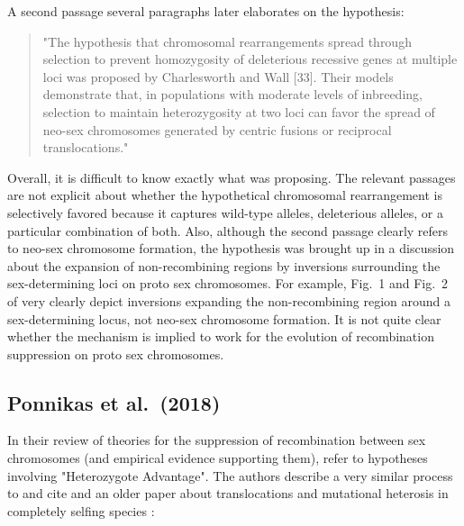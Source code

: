 \documentclass{article}
\begin{document}
\begin{appendices}
\noindent A second passage several paragraphs later elaborates on the hypothesis:

	\begin{quote}
		"The hypothesis that chromosomal rearrangements spread through selection to prevent homozygosity of deleterious recessive genes at multiple loci was proposed by Charlesworth and Wall [33]. Their models demonstrate that, in populations with moderate levels of inbreeding, selection to maintain heterozygosity at two loci can favor the spread of neo-sex chromosomes generated by centric fusions or reciprocal translocations."
	\end{quote}

\noindent Overall, it is difficult to know exactly what \citet{Ironside2010} was proposing. The relevant passages are not explicit about whether the hypothetical chromosomal rearrangement is selectively favored because it captures wild-type alleles, deleterious alleles, or a particular combination of both. Also, although the second passage clearly refers to neo-sex chromosome formation, the hypothesis was brought up in a discussion about the expansion of non-recombining regions by inversions surrounding the sex-determining loci on proto sex chromosomes. For example, Fig.~1 and Fig.~2 of \citet{Ironside2010} very clearly depict inversions expanding the non-recombining region around a sex-determining locus, not neo-sex chromosome formation. It is not quite clear whether the mechanism is implied to work for the evolution of recombination suppression on proto sex chromosomes. 


\subsection*{Ponnikas et al.~(2018)}

In their review of theories for the suppression of recombination between sex chromosomes (and empirical evidence supporting them), \citet{Ponnikas2018} refer to hypotheses involving "Heterozygote Advantage". The authors describe a very similar process to \citet{Ironside2010} and cite \citet{CharlesworthWall1999} and an older paper about translocations and mutational heterosis in completely selfing species \citep{deWaalMaleFijtCharlesworth1979}:


\end{appendices}
\end{document}
